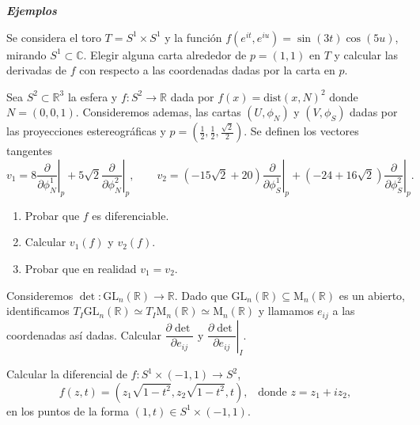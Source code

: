 \documentclass[12pt, a4paper]{amsart}
\theoremstyle{definition}
\newcommand{\CC}{\mathbb{C}}
\newcommand{\RR}{\mathbb{R}}      %
\begin{document}
\textsl{\textbf{Ejemplos}}
\vspace{1em}

\begin{question}
Se considera el toro $T=S^1\times S^1$ y la función $f(e^{it},e^{iu})=\sin(3t)\cos(5u)$, mirando $S^1\subset\CC$. Elegir alguna carta alrededor de $p=(1,1)$ en $T$ y calcular las derivadas de $f$ con respecto a las coordenadas dadas por la carta en $p$.
\end{question}

\begin{question}
Sea $S^2\subset\RR^3$ la esfera y $f:S^2\to\RR$ dada por $f(x)=\mathrm{dist}(x,N)^2$ donde $N=(0,0,1)$. Consideremos ademas, las cartas $(U,\phi_N)$ y $(V,\phi_S)$ dadas por las proyecciones estereográficas y $p=(\frac{1}{2},\frac{1}{2},\frac{\sqrt{2}}{2})$.
Se definen los vectores tangentes
$$v_1=8\left.\dfrac{\partial}{\partial\phi_N^1}\right|_{p}+5\sqrt{2}\left.\dfrac{\partial}{\partial\phi_N^2}\right|_{p},\qquad v_2=(-15\sqrt 2+20)\left.\dfrac{\partial}{\partial\phi_S^1}\right|_{p}+(-24+16\sqrt{2})\left.\dfrac{\partial}{\partial\phi_S^2}\right|_{p}.$$
    \begin{enumerate}[label=\textbf{\alph*.}]
    \item Probar que $f$ es diferenciable.
    \item Calcular $v_1(f)$ y $v_2(f)$.
    \item Probar que en realidad $v_1=v_2$.
    \end{enumerate}
\end{question}

\begin{question}
Consideremos $\det:\mathrm{GL}_n(\RR)\to\RR$. Dado que $\mathrm{GL}_n(\RR)\subseteq\mathrm{M}_n(\RR)$ es un abierto, identificamos $T_I\mathrm{GL}_n(\RR)\simeq T_I\mathrm{M}_n(\RR)\simeq\mathrm{M}_n(\RR)$ y llamamos $e_{ij}$ a las coordenadas así dadas. Calcular $\dfrac{\partial\det}{\partial e_{ij}}$ y $\left.\dfrac{\partial\det}{\partial e_{ij}}\right|_I$.
\end{question}

\begin{question}
Calcular la diferencial de $f:S^1\times (-1,1)\to S^2$, $$f(z,t)=(z_1\sqrt{1-t^2},z_2\sqrt{1-t^2},t),\;\;\;\text{donde }z=z_1+iz_2,$$ en los puntos de la forma $(1,t)\in S^1\times (-1,1)$.
\end{question}
\end{document}
